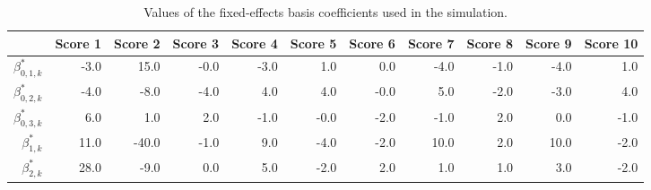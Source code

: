\begin{table}[ht]
\centering
\begin{tabular}{rrrrrrrrrrr}
  \hline
 & {\bfseries Score 1} & {\bfseries Score 2} & {\bfseries Score 3} & {\bfseries Score 4} & {\bfseries Score 5} & {\bfseries Score 6} & {\bfseries Score 7} & {\bfseries Score 8} & {\bfseries Score 9} & {\bfseries Score 10} \\ 
  \hline
$\beta_{0, 1, k}^*$ & -3.0 & 15.0 & -0.0 & -3.0 & 1.0 & 0.0 & -4.0 & -1.0 & -4.0 & 1.0 \\ 
  $\beta_{0, 2, k}^*$ & -4.0 & -8.0 & -4.0 & 4.0 & 4.0 & -0.0 & 5.0 & -2.0 & -3.0 & 4.0 \\ 
  $\beta_{0, 3, k}^*$ & 6.0 & 1.0 & 2.0 & -1.0 & -0.0 & -2.0 & -1.0 & 2.0 & 0.0 & -1.0 \\ 
  $\beta_{1, k}^* $ & 11.0 & -40.0 & -1.0 & 9.0 & -4.0 & -2.0 & 10.0 & 2.0 & 10.0 & -2.0 \\ 
  $\beta_{2, k}^* $ & 28.0 & -9.0 & 0.0 & 5.0 & -2.0 & 2.0 & 1.0 & 1.0 & 3.0 & -2.0 \\ 
   \hline
\end{tabular}
\caption{Values of the fixed-effects basis coefficients used in the simulation.} 
\end{table}
